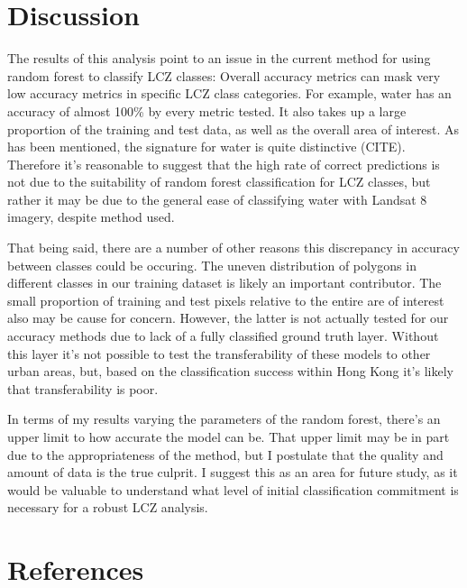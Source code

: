 \documentclass[
]{article}
\begin{document}
\hypertarget{discussion}{%
\section{Discussion}\label{discussion}}

The results of this analysis point to an issue in the current method for
using random forest to classify LCZ classes: Overall accuracy metrics
can mask very low accuracy metrics in specific LCZ class categories. For
example, water has an accuracy of almost 100\% by every metric tested.
It also takes up a large proportion of the training and test data, as
well as the overall area of interest. As has been mentioned, the
signature for water is quite distinctive (CITE). Therefore it's
reasonable to suggest that the high rate of correct predictions is not
due to the suitability of random forest classification for LCZ classes,
but rather it may be due to the general ease of classifying water with
Landsat 8 imagery, despite method used.

That being said, there are a number of other reasons this discrepancy in
accuracy between classes could be occuring. The uneven distribution of
polygons in different classes in our training dataset is likely an
important contributor. The small proportion of training and test pixels
relative to the entire are of interest also may be cause for concern.
However, the latter is not actually tested for our accuracy methods due
to lack of a fully classified ground truth layer. Without this layer
it's not possible to test the transferability of these models to other
urban areas, but, based on the classification success within Hong Kong
it's likely that transferability is poor.

In terms of my results varying the parameters of the random forest,
there's an upper limit to how accurate the model can be. That upper
limit may be in part due to the appropriateness of the method, but I
postulate that the quality and amount of data is the true culprit. I
suggest this as an area for future study, as it would be valuable to
understand what level of initial classification commitment is necessary
for a robust LCZ analysis.

\newpage

\hypertarget{references}{%
\section{References}\label{references}}
\end{document}
